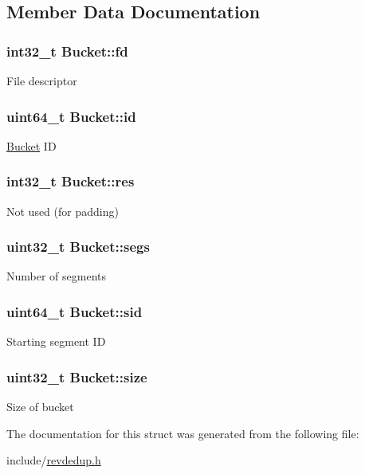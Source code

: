 \subsection{\-Member \-Data \-Documentation}
\hypertarget{structBucket_a56132451660649a4d77631b22b48b0c7}{
\subsubsection[{fd}]{\setlength{\rightskip}{0pt plus 5cm}int32\-\_\-t {\bf \-Bucket\-::fd}}}\label{structBucket_a56132451660649a4d77631b22b48b0c7}
\-File descriptor \hypertarget{structBucket_abb66360bd620404d05f1bb9212ff0583}{
\subsubsection[{id}]{\setlength{\rightskip}{0pt plus 5cm}uint64\-\_\-t {\bf \-Bucket\-::id}}}\label{structBucket_abb66360bd620404d05f1bb9212ff0583}
\hyperlink{structBucket}{\-Bucket} \-I\-D \hypertarget{structBucket_a857c526f6e8e0a89e2d065ae41da637c}{
\subsubsection[{res}]{\setlength{\rightskip}{0pt plus 5cm}int32\-\_\-t {\bf \-Bucket\-::res}}}\label{structBucket_a857c526f6e8e0a89e2d065ae41da637c}
\-Not used (for padding) \hypertarget{structBucket_ac691a63259aba90e9cd52c00c218a5ee}{
\subsubsection[{segs}]{\setlength{\rightskip}{0pt plus 5cm}uint32\-\_\-t {\bf \-Bucket\-::segs}}}\label{structBucket_ac691a63259aba90e9cd52c00c218a5ee}
\-Number of segments \hypertarget{structBucket_a33a6eab0fcb280fa539c161564302c37}{
\subsubsection[{sid}]{\setlength{\rightskip}{0pt plus 5cm}uint64\-\_\-t {\bf \-Bucket\-::sid}}}\label{structBucket_a33a6eab0fcb280fa539c161564302c37}
\-Starting segment \-I\-D \hypertarget{structBucket_af05cc6d1be2cce6c1b1c43c2a8df8071}{
\subsubsection[{size}]{\setlength{\rightskip}{0pt plus 5cm}uint32\-\_\-t {\bf \-Bucket\-::size}}}\label{structBucket_af05cc6d1be2cce6c1b1c43c2a8df8071}
\-Size of bucket 

\-The documentation for this struct was generated from the following file\-:\begin{DoxyCompactItemize}
\item 
include/\hyperlink{revdedup_8h}{revdedup.\-h}\end{DoxyCompactItemize}
